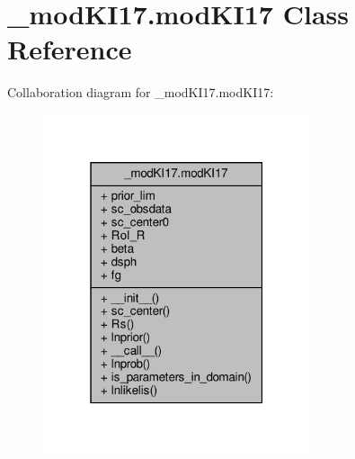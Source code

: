 \hypertarget{class__modKI17_1_1modKI17}{}\section{\+\_\+mod\+K\+I17.\+mod\+K\+I17 Class Reference}
\label{class__modKI17_1_1modKI17}


Collaboration diagram for \+\_\+mod\+K\+I17.\+mod\+K\+I17\+:\nopagebreak
\begin{figure}[H]
\begin{center}
\leavevmode
\includegraphics[width=223pt]{d4/dd3/class__modKI17_1_1modKI17__coll__graph}
\end{center}
\end{figure}
